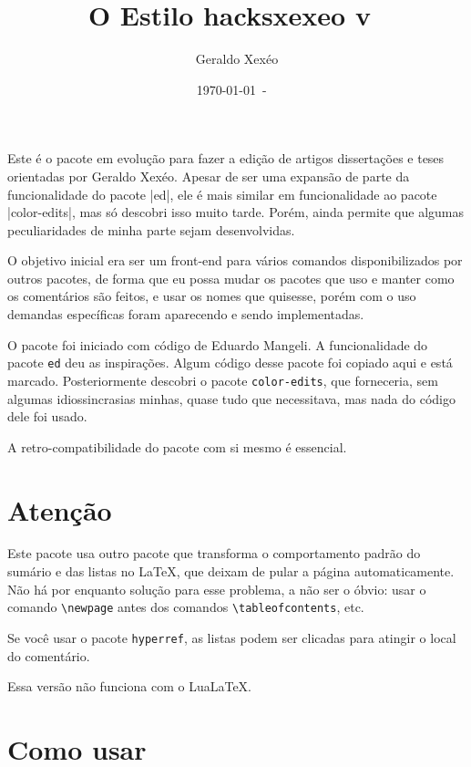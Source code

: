 \documentclass{article}
\title{O Estilo hacksxexeo v\ \hacksxexeoversion}
\author{Geraldo Xexéo}
\date{\today\ - \ \currenttime}
\begin{document}
    
    \maketitle
    
    Este é o  pacote em evolução para fazer a edição de artigos dissertações e teses orientadas por Geraldo Xexéo. Apesar de ser uma expansão de parte da funcionalidade do pacote |ed|, ele é mais similar em funcionalidade ao pacote |color-edits|, mas só descobri isso muito tarde. Porém, ainda permite que algumas peculiaridades de minha parte sejam desenvolvidas.
    
    O objetivo inicial era ser um front-end para vários comandos disponibilizados por outros pacotes, de forma que eu possa mudar os pacotes que uso e manter como os comentários são feitos, e usar os nomes que quisesse, porém com o uso demandas específicas foram aparecendo e sendo implementadas.
    
    O pacote foi iniciado com código de Eduardo Mangeli. A funcionalidade do pacote \verb|ed| deu as inspirações. Algum código desse pacote foi copiado aqui e está marcado. Posteriormente descobri o pacote \verb|color-edits|, que forneceria, sem algumas idiossincrasias minhas, quase tudo que necessitava, mas nada do código dele foi usado.
    
    A retro-compatibilidade do pacote com si mesmo é essencial.
    
    \section{Atenção}
    
    Este pacote usa outro pacote que transforma o comportamento padrão do sumário e das listas no \LaTeX, que deixam de pular a página automaticamente. Não há por enquanto solução para esse problema, a não ser o óbvio: usar o comando \verb!\newpage! antes dos comandos \verb!\tableofcontents!, etc.
    
    Se você usar o pacote \verb!hyperref!, as listas podem ser clicadas para atingir o local do comentário.
    
    Essa versão não funciona com o Lua\LaTeX.
    
    \section{Como usar}
    
\end{document}

